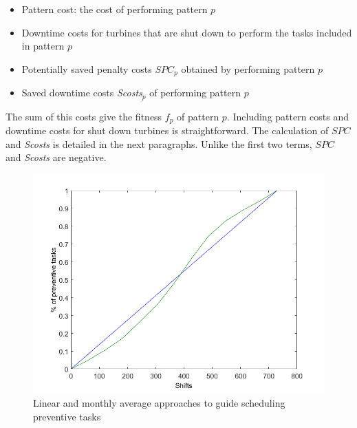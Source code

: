 \begin{itemize}
	\item Pattern cost: the cost of performing pattern $p$
	\item Downtime costs for turbines that are shut down to perform the tasks included in pattern $p$
	\item Potentially saved penalty costs $SPC_p$ obtained by performing pattern $p$%
	\item Saved downtime costs \emph{Scosts}$_p$ of performing pattern $p$ %
\end{itemize}
%
The sum of this costs give the fitness $f_p$ of pattern $p$.
Including pattern costs and downtime costs for shut down turbines is straightforward. The calculation of $S{PC}$ and \emph{Scosts} is detailed in the next paragraphs. Unlike the first two terms, $SPC$ and \emph{Scosts} are negative.
\begin{figure}[hbt]
	\begin{center}
		\includegraphics[scale=0.5]{EJOR/figures/developactivities.png}
	\end{center}
	\caption{Linear and monthly average approaches to guide scheduling preventive tasks}
	\label{fig:monthavg}
\end{figure}
